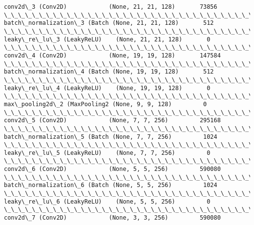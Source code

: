 \documentclass[11pt]{article}
\begin{document}
\begin{Verbatim}[commandchars=\\\{\}]
conv2d\_3 (Conv2D)            (None, 21, 21, 128)       73856     
\_\_\_\_\_\_\_\_\_\_\_\_\_\_\_\_\_\_\_\_\_\_\_\_\_\_\_\_\_\_\_\_\_\_\_\_\_\_\_\_\_\_\_\_\_\_\_\_\_\_\_\_\_\_\_\_\_\_\_\_\_\_\_\_\_
batch\_normalization\_3 (Batch (None, 21, 21, 128)       512       
\_\_\_\_\_\_\_\_\_\_\_\_\_\_\_\_\_\_\_\_\_\_\_\_\_\_\_\_\_\_\_\_\_\_\_\_\_\_\_\_\_\_\_\_\_\_\_\_\_\_\_\_\_\_\_\_\_\_\_\_\_\_\_\_\_
leaky\_re\_lu\_3 (LeakyReLU)    (None, 21, 21, 128)       0         
\_\_\_\_\_\_\_\_\_\_\_\_\_\_\_\_\_\_\_\_\_\_\_\_\_\_\_\_\_\_\_\_\_\_\_\_\_\_\_\_\_\_\_\_\_\_\_\_\_\_\_\_\_\_\_\_\_\_\_\_\_\_\_\_\_
conv2d\_4 (Conv2D)            (None, 19, 19, 128)       147584    
\_\_\_\_\_\_\_\_\_\_\_\_\_\_\_\_\_\_\_\_\_\_\_\_\_\_\_\_\_\_\_\_\_\_\_\_\_\_\_\_\_\_\_\_\_\_\_\_\_\_\_\_\_\_\_\_\_\_\_\_\_\_\_\_\_
batch\_normalization\_4 (Batch (None, 19, 19, 128)       512       
\_\_\_\_\_\_\_\_\_\_\_\_\_\_\_\_\_\_\_\_\_\_\_\_\_\_\_\_\_\_\_\_\_\_\_\_\_\_\_\_\_\_\_\_\_\_\_\_\_\_\_\_\_\_\_\_\_\_\_\_\_\_\_\_\_
leaky\_re\_lu\_4 (LeakyReLU)    (None, 19, 19, 128)       0         
\_\_\_\_\_\_\_\_\_\_\_\_\_\_\_\_\_\_\_\_\_\_\_\_\_\_\_\_\_\_\_\_\_\_\_\_\_\_\_\_\_\_\_\_\_\_\_\_\_\_\_\_\_\_\_\_\_\_\_\_\_\_\_\_\_
max\_pooling2d\_2 (MaxPooling2 (None, 9, 9, 128)         0         
\_\_\_\_\_\_\_\_\_\_\_\_\_\_\_\_\_\_\_\_\_\_\_\_\_\_\_\_\_\_\_\_\_\_\_\_\_\_\_\_\_\_\_\_\_\_\_\_\_\_\_\_\_\_\_\_\_\_\_\_\_\_\_\_\_
conv2d\_5 (Conv2D)            (None, 7, 7, 256)         295168    
\_\_\_\_\_\_\_\_\_\_\_\_\_\_\_\_\_\_\_\_\_\_\_\_\_\_\_\_\_\_\_\_\_\_\_\_\_\_\_\_\_\_\_\_\_\_\_\_\_\_\_\_\_\_\_\_\_\_\_\_\_\_\_\_\_
batch\_normalization\_5 (Batch (None, 7, 7, 256)         1024      
\_\_\_\_\_\_\_\_\_\_\_\_\_\_\_\_\_\_\_\_\_\_\_\_\_\_\_\_\_\_\_\_\_\_\_\_\_\_\_\_\_\_\_\_\_\_\_\_\_\_\_\_\_\_\_\_\_\_\_\_\_\_\_\_\_
leaky\_re\_lu\_5 (LeakyReLU)    (None, 7, 7, 256)         0         
\_\_\_\_\_\_\_\_\_\_\_\_\_\_\_\_\_\_\_\_\_\_\_\_\_\_\_\_\_\_\_\_\_\_\_\_\_\_\_\_\_\_\_\_\_\_\_\_\_\_\_\_\_\_\_\_\_\_\_\_\_\_\_\_\_
conv2d\_6 (Conv2D)            (None, 5, 5, 256)         590080    
\_\_\_\_\_\_\_\_\_\_\_\_\_\_\_\_\_\_\_\_\_\_\_\_\_\_\_\_\_\_\_\_\_\_\_\_\_\_\_\_\_\_\_\_\_\_\_\_\_\_\_\_\_\_\_\_\_\_\_\_\_\_\_\_\_
batch\_normalization\_6 (Batch (None, 5, 5, 256)         1024      
\_\_\_\_\_\_\_\_\_\_\_\_\_\_\_\_\_\_\_\_\_\_\_\_\_\_\_\_\_\_\_\_\_\_\_\_\_\_\_\_\_\_\_\_\_\_\_\_\_\_\_\_\_\_\_\_\_\_\_\_\_\_\_\_\_
leaky\_re\_lu\_6 (LeakyReLU)    (None, 5, 5, 256)         0         
\_\_\_\_\_\_\_\_\_\_\_\_\_\_\_\_\_\_\_\_\_\_\_\_\_\_\_\_\_\_\_\_\_\_\_\_\_\_\_\_\_\_\_\_\_\_\_\_\_\_\_\_\_\_\_\_\_\_\_\_\_\_\_\_\_
conv2d\_7 (Conv2D)            (None, 3, 3, 256)         590080    

\end{Verbatim}
\end{document}
